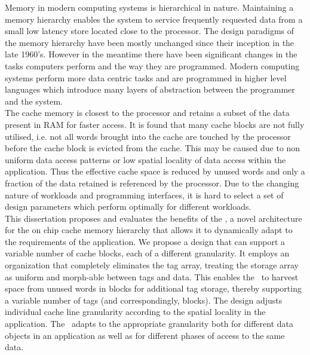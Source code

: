 
%
%


Memory in modern computing systems is hierarchical in nature. Maintaining a memory hierarchy enables the system to service frequently requested data from a small low latency store located close to the processor. The design paradigms of the memory hierarchy have been mostly unchanged since their inception in the late 1960's. However in the meantime there have been significant changes in the tasks computers perform and the way they are programmed. Modern computing systems perform more data centric tasks and are programmed in higher level languages which introduce many layers of abstraction between the programmer and the system. \\

The cache memory is closest to the processor and retains a subset of the data present in RAM for faster access. It is found that many cache blocks are not fully utilised, i.e. not all words brought into the cache are touched by the processor before the cache block is evicted from the cache. This may be caused due to non uniform data access patterns or low spatial locality of data access within the application. Thus the effective cache space is reduced by unused words and only a fraction of the data retained is referenced by the processor. Due to the changing nature of workloads and programming interfaces, it is hard to select a set of design parameters which perform optimally for different workloads. \\

This dissertation proposes and evaluates the benefits of the \AC{}, a novel architecture for the on chip cache memory hierarchy that allows it to dynamically adapt to the requirements of the application. We propose a design that can support a variable number of cache blocks, each of a different granularity. It employs an organization that completely eliminates the tag array, treating the storage array as uniform and morph-able between tags and data.  This enables the \AC\ to harvest space from unused words in blocks for additional tag storage, thereby supporting a variable number of tags (and correspondingly, blocks). The design adjusts individual cache line granularity according to the spatial locality in the application. The \AC\ adapts to the appropriate granularity both for different data objects in an application as well as for different phases of access to the same data. \\

